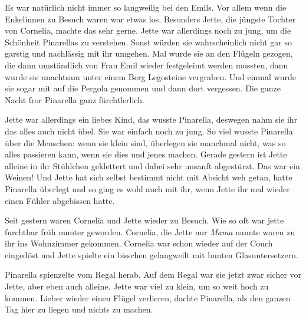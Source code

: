Es war natürlich nicht immer so langweilig bei den Emils. Vor allem wenn die Enkelinnen zu Besuch waren war etwas los. Besonders Jette, die jüngste Tochter von Cornelia, machte das sehr gerne.  Jette war allerdings noch zu jung, um die Schönheit Pinarellas zu verstehen. Sonst würden sie wahrscheinlich nicht gar so garstig und nachlässig mit ihr umgehen. Mal wurde sie an den Flügeln gezogen, die dann umständlich von Frau Emil wieder festgeleimt werden mussten, dann wurde sie unachtsam unter einem Berg Legosteine vergraben. Und einmal wurde sie sogar mit auf die Pergola genommen und dann dort vergessen. Die ganze Nacht fror Pinarella ganz fürchtlerlich.

Jette war allerdings ein liebes Kind, das wusste Pinarella, deswegen nahm sie ihr das alles auch nicht übel. Sie war einfach noch zu jung. So viel wusste Pinarella über die Menschen: wenn sie klein sind, überlegen sie manchmal nicht, was so alles passieren kann, wenn sie dies und jenes machen. Gerade gestern ist Jette alleine in ihr Stühlchen geklettert und dabei sehr unsanft abgestürzt. Das war ein Weinen! Und Jette hat sich selbst bestimmt nicht mit Absicht weh getan, hatte Pinarella überlegt und so ging es wohl auch mit ihr, wenn Jette ihr mal wieder einen Fühler abgebissen hatte.

Seit gestern waren Cornelia und Jette wieder zu Besuch. Wie so oft war jette furchtbar früh munter geworden. Cornelia, die Jette nur {\it Mama} nannte waren zu ihr ins Wohnzimmer gekommen. Cornelia war schon wieder auf der Couch eingedöst und Jette spielte ein bisschen gelangweilt mit bunten Glasuntersetzern. 

Pinarella spienzelte vom Regal herab.  Auf dem Regal war sie jetzt zwar sicher vor Jette, aber eben auch alleine. Jette war viel zu klein, um so weit hoch zu kommen. Lieber wieder einen Flügel verlieren, dachte Pinarella, als den ganzen Tag hier zu liegen und nichts zu machen.

